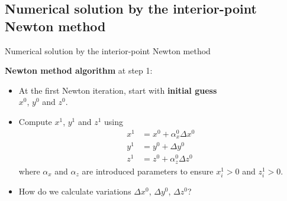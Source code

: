 \subsection{Numerical solution by the interior-point Newton method}
%
\begin{frame}{Numerical solution by the interior-point Newton method}

\alert{\bf Newton method algorithm} at step 1: 
%
\begin{itemize}
\item At the first Newton iteration, start with {\bf initial guess} \\
${x^{0}}$,
${y^{0}}$ and 
${z^{0}}$. 
\end{itemize}

\begin{itemize}
\item Compute ${x^{1}}$, ${y^{1}}$
and ${z^{1}}$ using
\begin{align*}
x^{1} & =x^{0}+\alpha_{x}^{0}\Delta x^{0}\\
y^{1} & =y^{0}+\Delta y^{0}\\
z^{1} & =z^{0}+\alpha_{z}^{0}\Delta z^{0}
\end{align*}
where $\alpha_{x}$ and $\alpha_{z}$ are introduced parameters to ensure $x_{i}^{1}>0$ and $z_{i}^{1}>0$. 
\item How do we calculate variations 
$\Delta x^{0}$, $\Delta y^{0}$, $\Delta z^{0}$?
\end{itemize}

\end{frame}
%
